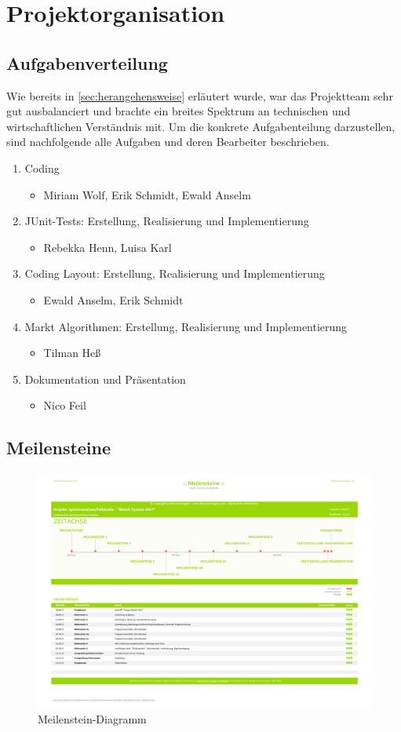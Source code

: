 \clearpage
\chapter{Projektorganisation}
\section{Aufgabenverteilung}
Wie bereits in \ref{sec:herangehensweise} erläutert wurde, war das Projektteam sehr gut ausbalanciert und brachte ein breites Spektrum an technischen und wirtschaftlichen Verständnis mit. Um die konkrete Aufgabenteilung darzustellen, sind nachfolgende alle Aufgaben und deren Bearbeiter beschrieben. 
\begin{enumerate}
	\item Coding
	\begin{itemize}
		\item Miriam Wolf, Erik Schmidt, Ewald Anselm
	\end{itemize} 
	\item JUnit-Tests: Erstellung, Realisierung und Implementierung
	\begin{itemize}
		\item Rebekka Henn, Luisa Karl
	\end{itemize} 
	\item Coding Layout: Erstellung, Realisierung und Implementierung
	\begin{itemize}
		\item Ewald Anselm, Erik Schmidt
	\end{itemize} 
	\item Markt Algorithmen: Erstellung, Realisierung und Implementierung
	\begin{itemize}
		\item Tilman Heß
	\end{itemize} 	
	\item Dokumentation und Präsentation
	\begin{itemize}
	\item Nico Feil
	\end{itemize}
\end{enumerate}
\clearpage
\section{Meilensteine}\label{sec:meilenstein}
\begin{figure}[!h]
	\centering
	\includegraphics[angle=90, scale=0.45]{img/Meilensteine_Fallstudie.pdf}
	\caption{Meilenstein-Diagramm} \label{fig:abb}
\end{figure}
